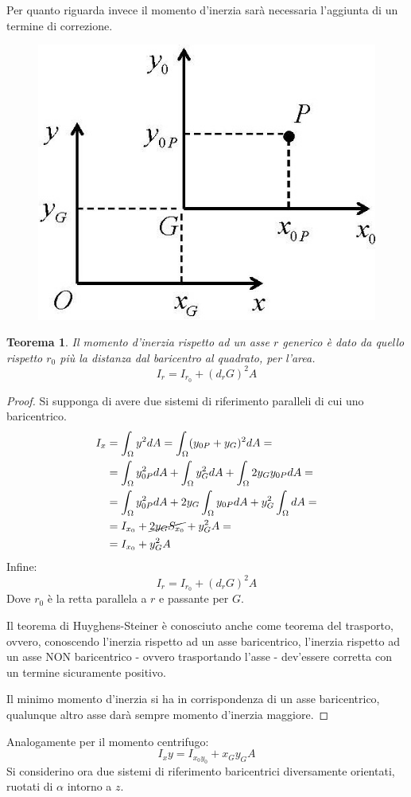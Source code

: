 \documentclass{article}
\newtheorem*{thm}{Teorema}
\begin{document}
\begin{adjustwidth}{2in}{}
	Per quanto riguarda invece il momento d'inerzia sarà necessaria l'aggiunta di un termine di correzione.
\begin{figure}[H]
	\centering
	\includegraphics[width=0.25\linewidth]{immagini/1.PARTE7_Pagina_73}
\end{figure}
	\begin{thm}
		Il momento d'inerzia rispetto ad un asse $r$ generico è dato da quello rispetto $r_0$ più la distanza dal baricentro al quadrato, per l'area.
		\[  I_r = I_{r_0} + (d_rG)^2 A\]
	\end{thm}
	\begin{proof}
		Si supponga di avere due sistemi di riferimento paralleli di cui uno baricentrico.
	\[ \begin{split}
	I_x & = \int_{\Omega} y^2dA = \int_{\Omega} (y_{0P} + y_G)^2dA = \\
	    & = \int_{\Omega} y_{0P}^2dA + \int_{\Omega}y_G^2dA + \int_{\Omega}2y_G y_{0P} dA = \\
	    & = \int_{\Omega} y_{0P}^2dA + 2y_G\int_{\Omega} y_{0P} dA + y_G^2\int_{\Omega}dA  = \\
	    & = I_{x_0} + \cancel{2y_G S_{x_0}} + y_G^2A = \\
	    & = I_{x_0} + y_G^2A
	\end{split}
	\] 
	Infine: 
	\[  I_r = I_{r_0} + (d_rG)^2 A\]
	Dove $ r_0 $ è la retta parallela a $ r $ e passante per $ G $. \newline 
	
	Il teorema di Huyghens-Steiner è conosciuto anche come teorema del trasporto, ovvero, conoscendo l'inerzia rispetto ad un asse baricentrico, l'inerzia rispetto ad un asse NON baricentrico - ovvero trasportando l'asse - dev'essere corretta con un termine sicuramente positivo. \newline
	
	Il minimo momento d'inerzia si ha in corrispondenza di un asse baricentrico, qualunque altro asse darà sempre momento d'inerzia maggiore.
	\end{proof}
	
	Analogamente per il momento centrifugo:
	\[  I_xy = I_{x_0y_0} + x_Gy_G A\]
\newpage
	Si considerino ora due sistemi di riferimento baricentrici
	diversamente orientati, ruotati di $\alpha$ intorno a $z$. 


\end{adjustwidth}
\end{document}

